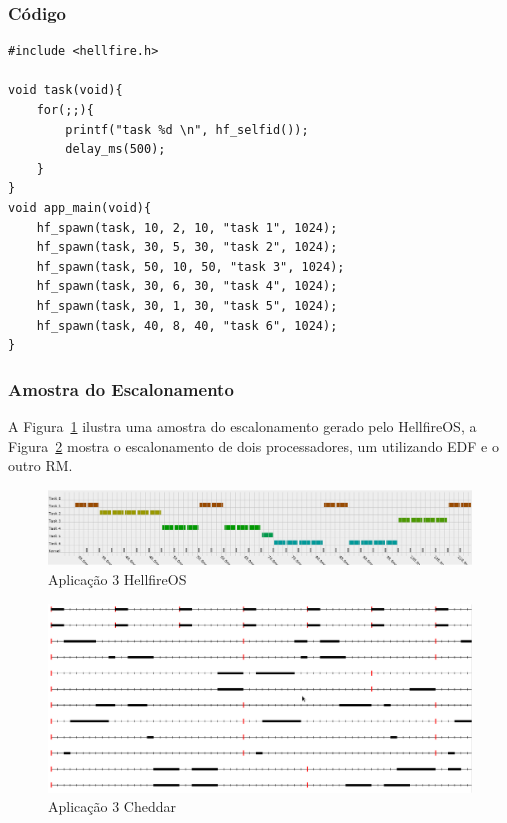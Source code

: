 \documentclass[12pt]{article}
\begin{document}
\subsubsection{Código} 
\begin{lstlisting}[showstringspaces=false]
#include <hellfire.h>

void task(void){
	for(;;){
		printf("task %d \n", hf_selfid());		
		delay_ms(500);
	}
}
void app_main(void){
	hf_spawn(task, 10, 2, 10, "task 1", 1024);
	hf_spawn(task, 30, 5, 30, "task 2", 1024);
	hf_spawn(task, 50, 10, 50, "task 3", 1024);
	hf_spawn(task, 30, 6, 30, "task 4", 1024);
	hf_spawn(task, 30, 1, 30, "task 5", 1024);
	hf_spawn(task, 40, 8, 40, "task 6", 1024);
}
\end{lstlisting}

\subsubsection{Amostra do Escalonamento}

A Figura~\ref{fig:app3Hell} ilustra uma amostra do escalonamento gerado pelo HellfireOS, a Figura~\ref{fig:app3Chedder} mostra o escalonamento de dois processadores, um utilizando EDF e o outro RM. 

\begin{figure}[ht]
\centering
\caption{Aplicação 3 HellfireOS}
\label{fig:app3Hell}
\includegraphics[width=\columnwidth]{fig/app3HellSc.png}
\end{figure}

\begin{figure}[ht]
\centering
\caption{Aplicação 3 Cheddar}
\label{fig:app3Chedder}
\includegraphics[width=\columnwidth]{fig/app3CheSc.png}
\end{figure}
\end{document}
